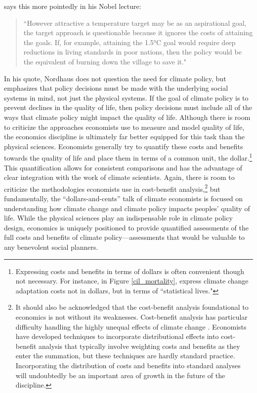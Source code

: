 \cite{nordhaus2019climate} says this more pointedly in his Nobel lecture:
\begin{quote}
	\singlespacing ``However attractive a temperature target may be as an aspirational goal, the target approach is questionable because it ignores the costs of attaining the goals. If, for example, attaining the 1.5°C goal would require deep reductions in living standards in poor nations, then the policy would be the equivalent of burning down the village to save it."
\end{quote}
In his quote, Nordhaus does not question the need for climate policy, but emphasizes that policy decisions must be made with the underlying social systems in mind, not just the physical systems. If the goal of climate policy is to prevent declines in the quality of life, then policy decisions must include all of the ways that climate policy might impact the quality of life. Although there is room to criticize the approaches economists use to measure and model quality of life, the economics discipline is ultimately far better equipped for this task than the physical sciences. Economists generally try to quantify these costs and benefits towards the quality of life and place them in terms of a common unit, the dollar.\footnote{Expressing costs and benefits in terms of dollars is often  convenient though not necessary. For instance, in Figure \ref{cil_mortality}, \cite{carleton2022valuing} express climate change adaptation costs not in dollars, but in terms of ``statistical lives."} This quantification allows for consistent comparisons and has the advantage of clear integration with the work of climate scientists. Again, there is room to criticize the methodologies economists use in cost-benefit analysis,\footnote{It should also be acknowledged that the cost-benefit analysis foundational to economics is not without its weaknesses. Cost-benefit analysis has particular difficulty handling the highly unequal effects of climate change \citep{kaufman2022how}. Economists have developed techniques to incorporate distributional effects into cost-benefit analysis that typically involve weighting costs and benefits as they enter the summation, but these techniques are hardly standard practice. Incorporating the distribution of costs and benefits into standard analyses will undoubtedly be an important area of growth in the future of the discipline.}  but fundamentally, the ``dollars-and-cents'' talk of climate economists is focused on understanding how climate change and climate policy impacts peoples' quality of life. While the physical sciences play an indispensable role in climate policy design, economics is uniquely positioned to provide quantified assessments of the full costs and benefits of climate policy---assessments that would be valuable to any benevolent social planners.

